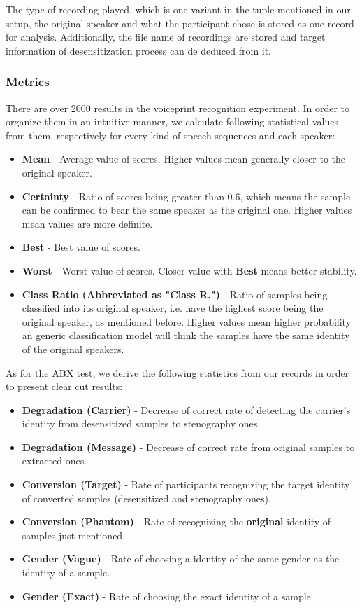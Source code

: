 \documentclass[journal]{IEEEtran} %
\begin{document}
The type of recording played, which is one variant in the tuple mentioned in our setup, the original speaker and what the participant chose is stored as one record for analysis. Additionally, the file name of recordings are stored and target information of desensitization process can de deduced from it.

\subsubsection{Metrics}

There are over 2000 results in the voiceprint recognition experiment. In order to organize them in an intuitive manner, we calculate following statistical values from them, respectively for every kind of speech sequences and each speaker:

\begin{itemize}
    \item \textbf{Mean} - Average value of scores. Higher values mean generally closer to the original speaker.
    \item \textbf{Certainty} - Ratio of scores being greater than 0.6, which means the sample can be confirmed to bear the same speaker as the original one. Higher values mean values are more definite.
    \item \textbf{Best} - Best value of scores.
    \item \textbf{Worst} - Worst value of scores. Closer value with \textbf{Best} means better stability.
    \item \textbf{Class Ratio (Abbreviated as "Class R.")} - Ratio of samples being classified into its original speaker, i.e. have the highest score being the original speaker, as mentioned before. Higher values mean higher probability an generic classification model will think the samples have the same identity of the original speakers.
\end{itemize}

As for the ABX test, we derive the following statistics from our records in order to present clear cut results:

\begin{itemize}
    \item \textbf{Degradation (Carrier)} - Decrease of correct rate of detecting the carrier's identity from desensitized samples to stenography ones.
    \item \textbf{Degradation (Message)} - Decrease of correct rate from original samples to extracted ones.
    \item \textbf{Conversion (Target)} - Rate of participants recognizing the target identity of converted samples (desensitized and stenography ones).
    \item \textbf{Conversion (Phantom)} - Rate of recognizing the \textbf{original} identity of samples just mentioned.
    \item \textbf{Gender (Vague)} - Rate of choosing a identity of the same gender as the identity of a sample.
    \item \textbf{Gender (Exact)} - Rate of choosing the exact identity of a sample.
\end{itemize}
\end{document}
